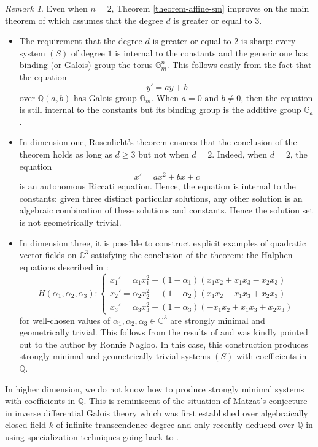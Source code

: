 \documentclass[12pt]{amsart}
\theoremstyle{definition}
\theoremstyle{plain}
\theoremstyle{exampstyle}
\theoremstyle{exampstyle}\newtheorem{thmxbis}{Theorem}
\numberwithin{equation}{section}
\theoremstyle{remark}
\newtheorem{remark}[definition]{Remark}
\begin{document}
\begin{remark} \label{remark-sharpdegree}
Even when $n = 2$, Theorem \ref{theorem-affine-sm} improves on the main theorem of \cite{jaoui-ANT} which assumes that the degree $d$ is greater or equal to $3$. 

\begin{itemize} 


\item The requirement that the degree $d$ is greater or equal to $2$ is sharp: every system $(S)$ of degree $1$ is internal to the constants and the generic one has binding (or Galois) group the torus $\mathbb{G}_m^n$. This follows easily from the fact that the equation 
$$y' = ay+b$$
over $\mathbb{Q}(a,b)$ has Galois group $\mathbb{G}_m$. When $a = 0 \text{ and } b \neq 0$, then the equation is still internal to the constants but its binding group is the additive group $\mathbb{G}_a$.

\item In dimension one, Rosenlicht's theorem \cite{Rosenlicht} ensures that the conclusion of the theorem holds as long as $d \geq 3$ but not when $d = 2$. Indeed, when $d = 2$, the equation 
$$x' = a x^2 + b x + c$$
is an autonomous Riccati equation. Hence, the equation is internal to the constants: given three distinct particular solutions, any other solution is an algebraic combination of these solutions and constants. Hence the solution set is not geometrically trivial. 
\item In dimension three, it is possible to construct explicit examples of quadratic vector fields on $\mathbb{C}^3$ satisfying the conclusion of the theorem: the Halphen equations described in \cite{Guillot}: 
$$H(\alpha_1,\alpha_2,\alpha_3): \begin{cases}
x_1' = \alpha_1 x_1^2 +  (1 - \alpha_1)(x_1x_2 + x_1x_3 - x_2x_3) \\ 
x_2' = \alpha_2 x_2^2 +  (1 - \alpha_2)(x_1x_2 - x_1x_3 + x_2x_3) \\
x_3' = \alpha_3 x_3^2 +  (1 - \alpha_3)(- x_1x_2 + x_1x_3 + x_2x_3)
\end{cases}$$
for well-chosen values of $\alpha_1,\alpha_2,\alpha_3 \in \mathbb{C}^3$ are strongly minimal and geometrically trivial. This follows from the results of \cite{BCFN} and was kindly pointed out to the author by Ronnie Nagloo. In this case, this construction produces strongly minimal and geometrically trivial systems $(S)$ with coefficients in $\mathbb{Q}$. 
\end{itemize}

In higher dimension, we do not know how to produce strongly minimal systems with coefficients in $\overline{\mathbb{Q}}$. This is reminiscent of the situation of Matzat's conjecture in inverse differential Galois theory which was first established over algebraically closed field $k$ of infinite transcendence degree and only recently deduced over  $\overline{\mathbb{Q}}$ in \cite{Feng-Wibmer} using specialization techniques going back to \cite{Hrushovski-Galois}.
\end{remark}
\end{document}
